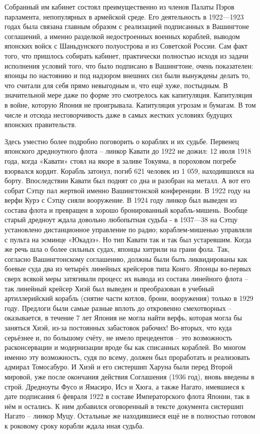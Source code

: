 Собранный им кабинет состоял преимущественно из членов Палаты Пэров парламента, непопулярных в армейской среде. Его деятельность в 1922—1923 годах была связана главным образом с реализацией подписанных в Вашингтоне соглашений, а именно разделкой недостроенных военных кораблей, выводом японских войск с Шаньдунского полуострова и из Советской России. Сам факт того, что пришлось собирать кабинет, практически полностью исходя из задачи исполнения условий того, что было подписано в Вашингтоне, очень показателен: японцы по настоянию и под надзором внешних сил были вынуждены делать то, что считали для себя прямо невыгодным и, что ещё хуже, постыдным. В значительной мере даже по форме это смотрелось как капитуляция. Капитуляция в войне, которую Япония не проигрывала. Капитуляция угрозам и бумагам. В том числе и отсюда несговорчивость даже в самых жестких условиях будущих японских правительств.

Здесь уместно более подробно поговорить о кораблях и их судьбе. Первенец японского дредноутного флота – линкор Кавати до 1922 не дожил: 12 июля 1918 года, когда «Кавати» стоял на якоре в заливе Токуяма, в пороховом погребе взорвался кордит. Корабль затонул, погиб 621 человек из 1 059, находившихся на борту. Впоследствии Кавати был поднят со дна и разобран на металл. А вот его собрат Сэтцу пал жертвой именно Вашингтонской конференции. В 1922 году на верфи Курэ с Сэтцу сняли вооружение. В 1924 году линкор был выведен из состава флота и превращен в хорошо бронированный корабль-мишень. Вообще старый дредноут ждала довольно любопытная судьба - в 1937—38 на Сэтцу установлено дистанционное управление по радио; кораблем-мишенью управляли с пульта на эсминце «Юкадзэ». Но тип Кавати так и так был устаревшим. Когда же речь шла о более сильных судах, японцы хитрили на грани фола. Так, согласно Вашингтонскому соглашению, должны были быть ликвидированы как боевые суда два из четырёх линейных крейсеров типа Конго. Японцы во-первых сверх всякой меры затягивали процесс их вывода из состава линейного флота – так линейный крейсер Хиэй был выведен и преобразован в учебный артиллерийский корабль (снятие части котлов, брони, вооружения) только в 1929 году. Предлоги были самые разные вплоть до откровенно смехотворных – оказывается, в течение 7 лет Япония не могла найти верфь, которая могла бы заняться Хиэй, из-за постоянных забастовок рабочих! Во-вторых, что куда серьёзнее и, по большому счёту, не имело прецедентов – это возможность расконсервации и модернизации вроде бы как списанных кораблей. Во многом именно эту возможность, судя по всему, должен был проработать и реализовать адмирал Томосабуро. И Хиэй и его систершип Харуна были перед Второй мировой, уже после окончания действия Соглашения (1936 год), вновь введены в строй. Дредноуты Фусо и Ямасиро, Исэ и Хюга, а также Нагато, имевшиеся к дате подписания 6 февраля 1922 в составе Императорского флота Японии, так в нём и остались. К ним добавился оговоренный в тексте документа систершип Нагато – линкор Муцу. Остальные же находившиеся ещё не в полностью готовом к роковому сроку корабли ждала иная судьба.

